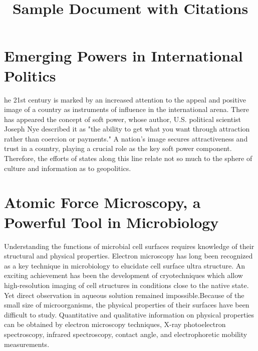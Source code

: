 \documentclass{article}
\begin{document}
	
	\title{Sample Document with Citations}
	\author{}
	\date{}
	\maketitle
	
	\section{Emerging Powers in International Politics}
	  he 21st century is marked by an increased attention 
      to the appeal and positive image of a country as instruments 
      of influence in the international arena\cite{bohomolov2012ghost}. 
      There has appeared the concept of soft power, whose author, U.S\cite{sergunin2015understanding}. political scientist Joseph Nye described it as "the ability to get what you want through attraction rather than coercion or payments\cite{hill2006moscow}." A nation's image secures attractiveness and trust in a country, playing a crucial role as the key soft power component\cite{kiseleva2015russia}. Therefore, the efforts of states along this line relate not so much to the sphere of culture and information as to geopolitics\cite{kosachev2012spsecific}.
	
	
	\section{Atomic Force Microscopy, a Powerful Tool in Microbiology}
      Understanding the functions of microbial cell surfaces
       requires knowledge of their structural and physical properties\cite{dufrene2002atomic}.
        Electron microscopy has long been recognized as a key technique in microbiology to 
        elucidate cell surface ultra structure\cite{engel1999atomic}. An exciting achievement 
        has been the development of cryotechniques which allow high-resolution imaging of cell 
        structures in conditions close to the native state\cite{franz2008atomic}. Yet direct
         observation in aqueous solution remained impossible.Because of the small size of 
         microorganisms, the physical properties of their surfaces have been difficult to 
         study\cite{marrese2017atomic}. Quantitative and qualitative information on 
         physical properties can be obtained by electron microscopy techniques, X-ray 
         photoelectron spectroscopy, infrared spectroscopy, contact angle, and electrophoretic
          mobility measurements\cite{altman2015noncontact}. 
	
	
	
	
\end{document}
